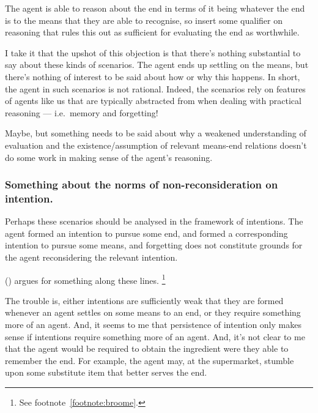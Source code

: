 \documentclass[10pt]{article}
\newcommand{\hozline}[0]{%
  \noindent\hdashrule[0.5ex][c]{\textwidth}{.1pt}{}
}
\newcommand{\hozlinedash}[0]{%
  \noindent\hdashrule[0.5ex][c]{\textwidth}{.1pt}{2.5pt}
}
\begin{document}
The agent is able to reason about the end in terms of it being whatever the end is to the means that they are able to recognise, so insert some qualifier on reasoning that rules this out as sufficient for evaluating the end as worthwhile.

I take it that the upshot of this objection is that there's nothing substantial to say about these kinds of scenarios.
The agent ends up settling on the means, but there's nothing of interest to be said about how or why this happens.
In short, the agent in such scenarios is not rational.
Indeed, the scenarios rely on features of agents like us that are typically abstracted from when dealing with practical reasoning --- i.e.\ memory and forgetting!

Maybe, but something needs to be said about why a weakened understanding of evaluation and the existence/assumption of relevant means-end relations doesn't do some work in making sense of the agent's reasoning.

\hozlinedash

\subsubsection*{Something about the norms of non-reconsideration on intention.}
\label{sec:someth-about-norms}

Perhaps these scenarios should be analysed in the framework of intentions.
The agent formed an intention to pursue some end, and formed a corresponding intention to pursue some means, and forgetting does not constitute grounds for the agent reconsidering the relevant intention.

\citeauthor{Broome:2013aa} (\citeyear{Broome:2013aa}) argues for something along these lines.\nolinebreak
\footnote{See footnote~\ref{footnote:broome}.}

The trouble is, either intentions are sufficiently weak that they are formed whenever an agent settles on some means to an end, or they require something more of an agent.
And, it seems to me that persistence of intention only makes sense if intentions require something more of an agent.
And, it's not clear to me that the agent would be required to obtain the ingredient were they able to remember the end.
For example, the agent may, at the supermarket, stumble upon some substitute item that better serves the end.

\hozline



\newpage
\end{document}

